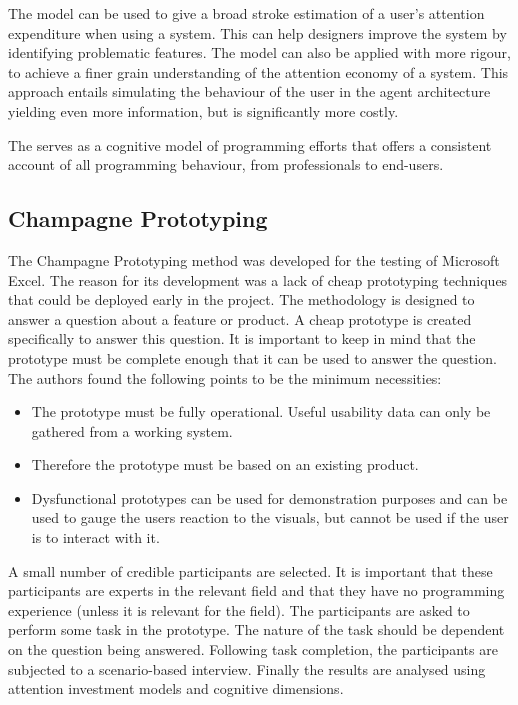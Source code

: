 The model can be used to give a broad stroke estimation of a user's attention expenditure when using a system. This can help designers improve the system by identifying problematic features. The model can also be applied with more rigour, to achieve a finer grain understanding of the attention economy of a system. This approach entails simulating the behaviour of the user in the agent architecture yielding even more information, but is significantly more costly.

The \attention serves as a cognitive model of programming efforts that offers a consistent account of all programming behaviour, from professionals to end-users.

\subsection{Champagne Prototyping} \label{sec:champagne}
The Champagne Prototyping method was developed for the testing of Microsoft Excel\cite{blackwell2004champagne}. The reason for its development was a lack of cheap prototyping techniques that could be deployed early in the project. The methodology is designed to answer a question about a feature or product. A cheap prototype is created specifically to answer this question. It is important to keep in mind that the prototype must be complete enough that it can be used to answer the question. The authors found the following points to be the minimum necessities:
\begin{itemize}
    \item The prototype must be fully operational. Useful usability data can only be gathered from a working system.
    \item Therefore the prototype must be based on an existing product.
    \item Dysfunctional prototypes can be used for demonstration purposes and can be used to gauge the users reaction to the visuals, but cannot be used if the user is to interact with it.
\end{itemize}
A small number of credible participants are selected. It is important that these participants are experts in the relevant field and that they have no programming experience (unless it is relevant for the field). The participants are asked to perform some task in the prototype. The nature of the task should be dependent on the question being answered. Following task completion, the participants are subjected to a scenario-based interview. Finally the results are analysed using attention investment models and cognitive dimensions.

